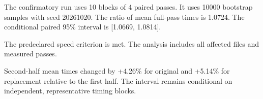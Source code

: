 The confirmatory run uses 10 blocks of 4 paired passes. It uses 10000 bootstrap samples with seed 20261020. The ratio of mean full-pass times is 1.0724. The conditional paired 95\% interval is [1.0669, 1.0814].

The predeclared speed criterion is met. The analysis includes all affected files and measured passes.

Second-half mean times changed by +4.26\% for original and +5.14\% for replacement relative to the first half. The interval remains conditional on independent, representative timing blocks.



